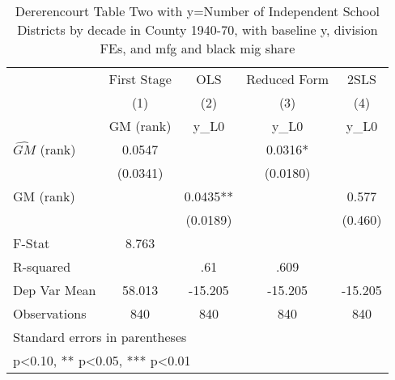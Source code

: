 \begin{table}[htbp]\centering
\def\sym#1{\ifmmode^{#1}\else\(^{#1}\)\fi}
\caption{Dererencourt Table Two with y=Number of Independent School Districts by decade in County 1940-70, with baseline y, division FEs, and mfg and black mig share}
\begin{tabular}{l*{4}{c}}
\toprule
                    & First Stage   &         OLS   &Reduced Form   &        2SLS   \\
                    &\multicolumn{1}{c}{(1)}&\multicolumn{1}{c}{(2)}&\multicolumn{1}{c}{(3)}&\multicolumn{1}{c}{(4)}\\
                    &\multicolumn{1}{c}{GM  (rank)}&\multicolumn{1}{c}{y\_L0}&\multicolumn{1}{c}{y\_L0}&\multicolumn{1}{c}{y\_L0}\\
\midrule
$\hat{GM}$ (rank)   &      0.0547   &               &      0.0316*  &               \\
                    &    (0.0341)   &               &    (0.0180)   &               \\
\addlinespace
GM  (rank)          &               &      0.0435** &               &       0.577   \\
                    &               &    (0.0189)   &               &     (0.460)   \\
\midrule
F-Stat              &       8.763   &               &               &               \\
R-squared           &               &         .61   &        .609   &               \\
Dep Var Mean        &      58.013   &     -15.205   &     -15.205   &     -15.205   \\
Observations        &         840   &         840   &         840   &         840   \\
\bottomrule
\multicolumn{5}{l}{\footnotesize Standard errors in parentheses}\\
\multicolumn{5}{l}{\footnotesize * p<0.10, ** p<0.05, *** p<0.01}\\
\end{tabular}
\end{table}
